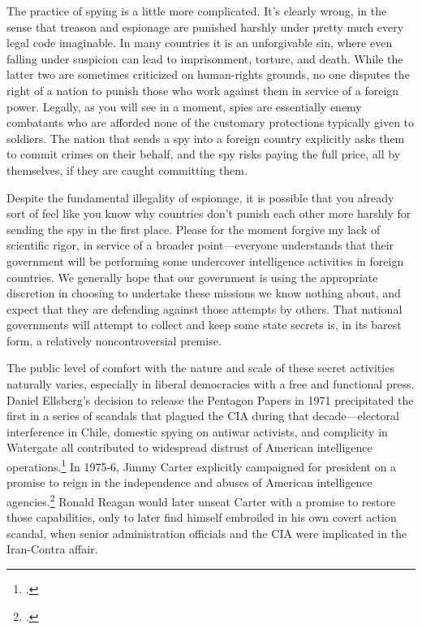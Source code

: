 \documentclass[12pt]{article}
\begin{document}
The practice of spying is a little more complicated. It's clearly wrong, in the sense that treason and espionage are punished harshly under pretty much every legal code imaginable. In many countries it is an unforgivable sin, where even falling under suspicion can lead to imprisonment, torture, and death. While the latter two are sometimes criticized on human-rights grounds, no one disputes the right of a nation to punish those who work against them in service of a foreign power. Legally, as you will see in a moment, spies are essentially enemy combatants who are afforded none of the customary protections typically given to soldiers. The nation that sends a spy into a foreign country explicitly asks them to commit crimes on their behalf, and the spy risks paying the full price, all by themselves, if they are caught committing them.

Despite the fundamental illegality of espionage, it is possible that you already sort of feel like you know why countries don't punish each other more harshly for sending the spy in the first place. Please for the moment forgive my lack of scientific rigor, in service of a broader point---everyone understands that their government will be performing some undercover intelligence activities in foreign countries. We generally hope that our government is using the appropriate discretion in choosing to undertake these missions we know nothing about, and expect that they are defending against those attempts by others. That national governments will attempt to collect and keep some state secrets is, in its barest form, a relatively noncontroversial premise.

The public level of comfort with the nature and scale of these secret activities naturally varies, especially in liberal democracies with a free and functional press. Daniel Ellsberg's decision to release the Pentagon Papers in 1971 precipitated the first in a series of scandals that plagued the CIA during that decade---electoral interference in Chile, domestic spying on antiwar activists, and complicity in Watergate all contributed to widespread distrust of American intelligence operations.\footcite[p.~214-215]{andrew_missing_1984} In 1975-6, Jimmy Carter explicitly campaigned for president on a promise to reign in the independence and abuses of American intelligence agencies.\footcite[p.~217]{andrew_missing_1984} Ronald Reagan would later unseat Carter with a promise to restore those capabilities, only to later find himself embroiled in his own covert action scandal, when senior administration officials and the CIA were implicated in the Iran-Contra affair.
\end{document}
